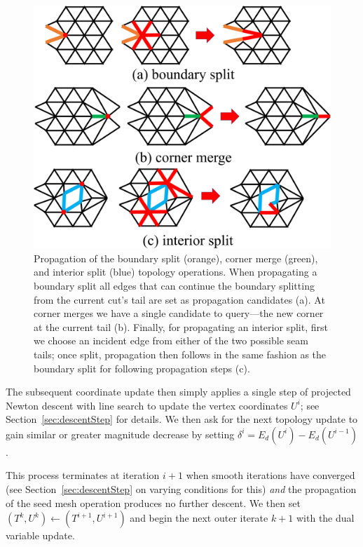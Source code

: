
\begin{figure}[t]
\centering
\includegraphics[width=0.65\linewidth]{fig/propagation.pdf}
\vspace{-0.3cm}
\caption{Propagation of the boundary split (orange), corner merge (green), and interior split (blue) topology operations. When propagating a boundary split all edges that can continue the boundary splitting from the current cut's tail are set as propagation candidates (a). At corner merges we have a single candidate to query---the new corner at the current tail (b). Finally, for propagating an interior split, first we choose an incident edge from either of the two possible seam tails; once split, propagation then follows in the same fashion as the boundary split for following propagation steps (c).}
\vspace{-0.3cm}
\label{fig:propagation}
\end{figure}

The subsequent coordinate update then simply applies a single step of projected Newton descent with line search to update the vertex coordinates $U^i$; see Section~\ref{sec:descentStep} for details. We then ask for the next topology update to gain similar or greater magnitude decrease by setting $\delta^i = E_d(U^i) - E_d(U^{i-1})$.

This process terminates at iteration $i+1$ when smooth iterations have converged (see Section~\ref{sec:descentStep} on varying conditions for this) \emph{and} the propagation of the seed mesh operation produces no further descent. We then set $(T^k,U^k) \leftarrow (T^{i+1},U^{i+1})$ and begin the next outer iterate $k+1$ with the dual variable update. 


